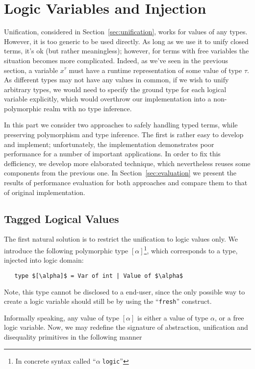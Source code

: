 \section{Logic Variables and Injection}
\label{sec:injection}

Unification, considered in Section~\ref{sec:unification}, works for values of any types. However, it
is too generic to be used directly. As long as we use it to unify closed terms, it's ok (but rather meaningless); 
however, for terms with free variables the situation becomes more complicated. Indeed, as we've seen in the
previous section, a variable $x^\tau$ must have a runtime representation of some value of type $\tau$. As different
types may not have any values in common, if we wish to unify arbitrary types, we would need to specify the 
ground type for each logical variable explicitly, which would overthrow our implementation into a non-polymorphic 
realm with no type inference.

In this part we consider two approaches to safely handling typed terms, while preserving polymorphism and
type inference. The first is rather easy to develop and implement; unfortunately, the implementation demonstrates 
poor performance for a number of important applications. In order to fix this defficiency, we develop more 
elaborated technique, which nevertheless reuses some components from the previous one. In Section~\ref{sec:evaluation}
we present the results of performance evaluation for both approaches and compare them to that of original 
implementation.

\subsection{Tagged Logical Values}

The first natural solution is to restrict the unification to logic values only. We introduce the following polymorphic
type $[\alpha]$\footnote{In concrete syntax called ``$\alpha\;$\lstinline{logic}''}, which corresponds to a type, injected into
logic domain:

\begin{lstlisting}
   type $[\alpha]$ = Var of int | Value of $\alpha$
\end{lstlisting}

Note, this type cannot be disclosed to a end-user, since the only possible way to create a logic variable should 
still be by using the ``\lstinline{fresh}'' construct.

Informally speaking, any value of type $[\alpha]$ is either a value of type $\alpha$, or a free
logic variable. Now, we may redefine the signature of abstraction, unification and disequality primitives in the
following manner

